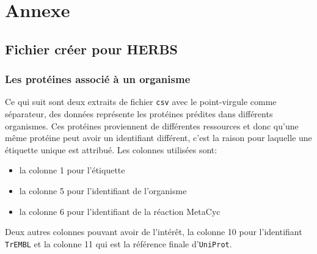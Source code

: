 \chapter{Annexe}

\section{Fichier créer pour HERBS}

\subsection{Les protéines associé à un organisme}

Ce qui suit sont deux extraits de fichier \texttt{csv} avec le point-virgule comme séparateur, des données représente les protéines prédites  dans différents organismes.
Ces protéines proviennent de différentes ressources et donc qu'une même protéine  peut avoir un identifiant différent, c'est la raison pour laquelle une étiquette unique est attribué. Les colonnes utilisées sont:
\begin{itemize}
	\item la colonne 1 pour l'étiquette
	\item la colonne 5 pour l'identifiant de l'organisme
	\item la colonne 6 pour l'identifiant de la réaction MetaCyc
\end{itemize}
 
 Deux autres colonnes pouvant avoir de l'intérêt, la colonne 10 pour l'identifiant \texttt{TrEMBL} et la colonne 11 qui est la référence finale d'\texttt{UniProt}.

